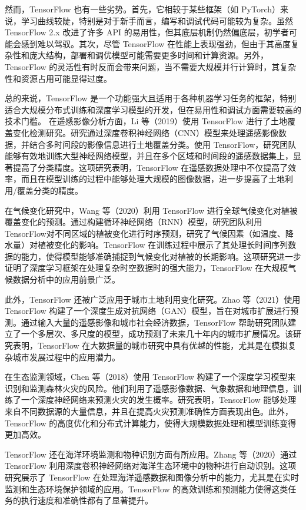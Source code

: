 \documentclass{article}
\begin{document}
	然而，TensorFlow 也有一些劣势。首先，它相较于某些框架（如 PyTorch）来说，学习曲线较陡，特别是对于新手而言，编写和调试代码可能较为复杂。虽然 TensorFlow 2.x 改进了许多 API 的易用性，但其底层机制仍然偏底层，初学者可能会感到难以驾驭。其次，尽管 TensorFlow 在性能上表现强劲，但由于其高度复杂性和庞大结构，部署和调优模型可能需要更多时间和计算资源。另外，TensorFlow 的灵活性有时反而会带来问题，当不需要大规模并行计算时，其复杂性和资源占用可能显得过度。
	
	总的来说，TensorFlow 是一个功能强大且适用于各种机器学习任务的框架，特别适合大规模分布式训练和深度学习模型的开发，但在易用性和调试方面需要较高的技术门槛。
	在遥感影像分析方面，Li 等（2019）使用 TensorFlow 进行了土地覆盖变化检测研究。研究通过深度卷积神经网络（CNN）模型来处理遥感影像数据，并结合多时间段的影像信息进行土地覆盖分类。使用 TensorFlow，研究团队能够有效地训练大型神经网络模型，并且在多个区域和时间段的遥感数据集上，显著提高了分类精度。这项研究表明，TensorFlow 在遥感数据处理中不仅提高了效率，而且在模型训练的过程中能够处理大规模的图像数据，进一步提高了土地利用/覆盖分类的精度。
	
	在气候变化研究中，Wang 等（2020）利用 TensorFlow 进行全球气候变化对植被覆盖变化的预测。通过构建循环神经网络（RNN）模型，研究团队利用TensorFlow对不同区域的植被变化进行时序预测，研究了气候因素（如温度、降水量）对植被变化的影响。TensorFlow 在训练过程中展示了其处理长时间序列数据的能力，使得模型能够准确捕捉到气候变化对植被的长期影响。这项研究进一步证明了深度学习框架在处理复杂时空数据时的强大能力，TensorFlow 在大规模气候数据分析中的应用前景广泛。
	
	此外，TensorFlow 还被广泛应用于城市土地利用变化研究。Zhao 等（2021）使用 TensorFlow 构建了一个深度生成对抗网络（GAN）模型，旨在对城市扩展进行预测。通过输入大量的遥感影像和城市社会经济数据，TensorFlow 帮助研究团队建立了一个多层次、多尺度的模型，成功预测了未来几十年内的城市扩展情况。该研究表明，TensorFlow 在大数据量的城市研究中具有优越的性能，尤其是在模拟复杂城市发展过程中的应用潜力。
	
	在生态监测领域，Chen 等（2018）使用 TensorFlow 构建了一个深度学习模型来识别和监测森林火灾的风险。他们利用了遥感影像数据、气象数据和地理信息，训练了一个深度神经网络来预测火灾的发生概率。研究表明，TensorFlow 能够处理来自不同数据源的大量信息，并且在提高火灾预测准确性方面表现出色。此外，TensorFlow 的高度优化和分布式计算能力，使得大规模数据处理和模型训练变得更加高效。
	
	TensorFlow 还在海洋环境监测和物种识别方面有所应用。Zhang 等（2020）通过 TensorFlow 利用深度卷积神经网络对海洋生态环境中的物种进行自动识别。这项研究展示了 TensorFlow 在处理海洋遥感数据和图像分析中的能力，尤其是在实时监测和生态环境保护领域的应用。TensorFlow 的高效训练和预测能力使得这类任务的执行速度和准确性都有了显著提升。
	
\end{document}
